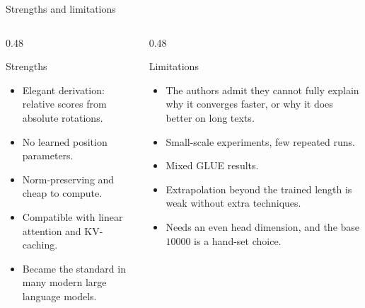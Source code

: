 \documentclass[aspectratio=169,11pt]{beamer}
\begin{document}
\begin{frame}{Strengths and limitations}
  \begin{columns}[T]
    \begin{column}{0.48\textwidth}
      \begin{exampleblock}{Strengths}
        \small
        \begin{itemize}
          \item Elegant derivation: relative scores from absolute rotations.
          \item No learned position parameters.
          \item Norm-preserving and cheap to compute.
          \item Compatible with linear attention and KV-caching.
          \item Became the standard in many modern large language models.
        \end{itemize}
      \end{exampleblock}
    \end{column}
    \begin{column}{0.48\textwidth}
      \begin{alertblock}{Limitations}
        \small
        \begin{itemize}
          \item The authors admit they cannot fully explain why it converges faster, or why it does better on long texts.
          \item Small-scale experiments, few repeated runs.
          \item Mixed GLUE results.
          \item Extrapolation beyond the trained length is weak without extra techniques.
          \item Needs an even head dimension, and the base $10000$ is a hand-set choice.
        \end{itemize}
      \end{alertblock}
    \end{column}
  \end{columns}
\end{frame}
\end{document}
